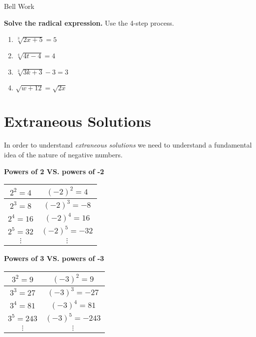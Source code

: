 \documentclass[12pt]{article}
\begin{document}
\pagebreak


\begin{center}
	\begin{Large}
		Bell Work\\
	\end{Large}
\end{center}

\textbf{Solve the radical expression.} Use the 4-step process.\\

\begin{enumerate}

	\item $\sqrt[3]{2x+5}=5$\\
	
	
	\item $\sqrt[4]{4t-4}=4$\\
	
	
	\item $\sqrt[3]{3k+3}-3=3$\\
	
	
	\item $\sqrt{w+12}=\sqrt{2x}$\\
\end{enumerate}

\pagebreak

\section{Extraneous Solutions}
In order to understand \textit{extraneous solutions} we need to understand a fundamental idea of the nature of negative numbers.\\

\begin{multicols}{2}

\textbf{Powers of 2 VS. powers of -2}\\

\begin{tabular}{|c|c|}

\hline

$2^2=4$ & $(-2)^2=4$\\
\hline
$2^3=8$ & $(-2)^3=-8$\\
\hline
$2^4=16$ & $(-2)^4=16$\\
\hline
$2^5=32$ & $(-2)^5=-32$\\
\hline
$\vdots$ & $\vdots$

\end{tabular}

\textbf{Powers of 3 VS. powers of -3}\\

\begin{tabular}{|c|c|}

\hline

$3^2=9$ & $(-3)^2=9$\\
\hline
$3^3=27$ & $(-3)^3=-27$\\
\hline
$3^4=81$ & $(-3)^4=81$\\
\hline
$3^5=243$ & $(-3)^5=-243$\\
\hline
$\vdots$ & $\vdots$

\end{tabular}

\end{multicols}
\end{document}
